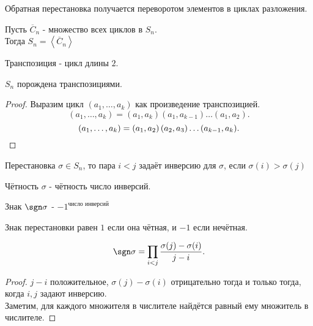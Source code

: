 \documentclass[11pt, oneside]{article}   	%
\begin{document}
    \begin{theorem}
        Обратная перестановка получается переворотом элементов в циклах разложения.
    \end{theorem}
    \begin{theorem}
        Пусть $\overline{C}_n$ - множество всех циклов в $S_n$.\\
        Тогда $S_n = \left<\overline{C}_n\right>$
    \end{theorem}
    \begin{definition}
        Транспозиция - цикл длины $2$.
    \end{definition}
    \begin{theorem}
        $S_n$  порождена транспозициями.\\
        \begin{proof}
            Выразим цикл $\left( a_1, \ldots, a_k \right) $ как произведение транспозицией.\\
            \[ (a_1, \ldots, a_k) = (a_1, a_k)(a_1, a_{k-1})\ldots\left( a_1, a_2 \right)  .\]
            \[ \left( a_1, \ldots, a_k \right) = \left( a_1, a_2 \right) \left( a_2, a_3 \right) \ldots (a_{k-1}, a_k) .\qedhere\] 
        \end{proof}
    \end{theorem}
    \begin{definition}
        Перестановка $\sigma\in S_n$, то пара $i<j$ задаёт инверсию для $\sigma$, если $\sigma(i)>\sigma(j)$
    \end{definition}
    \begin{definition}
        Чётность $\sigma$ - чётность число инверсий.
    \end{definition}
    \begin{definition}
        Знак $\sgn \sigma$ - $-1^{\text{число инверсий}}$
    \end{definition}
    \begin{dlemma}
        Знак перестановки равен $1$ если она чётная, и $-1$ если нечётная.
    \end{dlemma}
    \begin{dlemma}
        \[ \sgn \sigma = \prod\limits_{i<j} \frac{\sigma(j)-\sigma(i)}{j-i}  .\]
        \begin{proof}
            $j-i$ положительное, $\sigma(j)-\sigma(i)$ отрицательно тогда и только тогда, когда $i,j$ задают инверсию.\\
            Заметим, для каждого множителя в числителе найдётся равный ему множитель в числителе.
        \end{proof}
    \end{dlemma}
\end{document}
